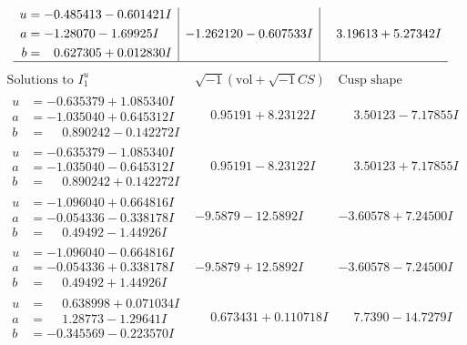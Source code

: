 \documentclass[1p]{elsarticle_modified}
\theoremstyle{definition}
\newcommand{\I}{\sqrt{-1}}
\begin{document}
$$\begin{array}{c|c|c}
\begin{aligned}
u &= -0.485413 - 0.601421 I \\
a &= -1.28070 - 1.69925 I \\
b &= \phantom{-}0.627305 + 0.012830 I\end{aligned}
 & -1.262120 - 0.607533 I & \phantom{-}3.19613 + 5.27342 I\\
 \hline 
 \end{array}$$\newpage$$\begin{array}{c|c|c}  
\text{Solutions to }I^u_{1}& \I (\text{vol} + \sqrt{-1}CS) & \text{Cusp shape}\\
 \hline 
\begin{aligned}
u &= -0.635379 + 1.085340 I \\
a &= -1.035040 + 0.645312 I \\
b &= \phantom{-}0.890242 - 0.142272 I\end{aligned}
 & \phantom{-}0.95191 + 8.23122 I & \phantom{-}3.50123 - 7.17855 I \\ \hline\begin{aligned}
u &= -0.635379 - 1.085340 I \\
a &= -1.035040 - 0.645312 I \\
b &= \phantom{-}0.890242 + 0.142272 I\end{aligned}
 & \phantom{-}0.95191 - 8.23122 I & \phantom{-}3.50123 + 7.17855 I \\ \hline\begin{aligned}
u &= -1.096040 + 0.664816 I \\
a &= -0.054336 - 0.338178 I \\
b &= \phantom{-}0.49492 - 1.44926 I\end{aligned}
 & -9.5879 - 12.5892 I & -3.60578 + 7.24500 I \\ \hline\begin{aligned}
u &= -1.096040 - 0.664816 I \\
a &= -0.054336 + 0.338178 I \\
b &= \phantom{-}0.49492 + 1.44926 I\end{aligned}
 & -9.5879 + 12.5892 I & -3.60578 - 7.24500 I \\ \hline\begin{aligned}
u &= \phantom{-}0.638998 + 0.071034 I \\
a &= \phantom{-}1.28773 - 1.29641 I \\
b &= -0.345569 - 0.223570 I\end{aligned}
 & \phantom{-}0.673431 + 0.110718 I & \phantom{-}7.7390 - 14.7279 I \\ \hline\begin{aligned}

\end{aligned}
\end{array}$$
\end{document}
